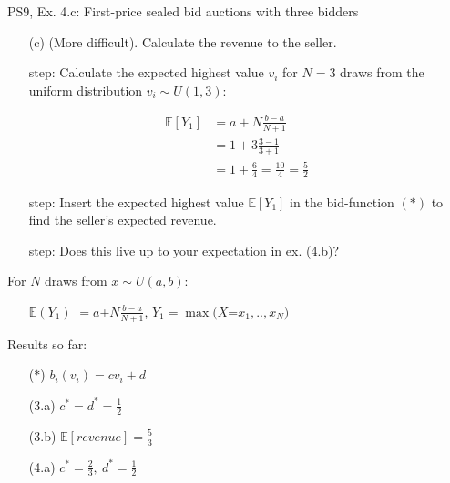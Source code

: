 \begin{frame}{PS9, Ex. 4.c: First-price sealed bid auctions with three bidders}
    \begin{itemize}
      \item[(c)] (More difficult). Calculate the revenue to the seller.
    \end{itemize}
    \vspace{-10pt}
    \begin{multicols}{2}
      \begin{itemize}
        \item[\nth{1} step:] Calculate the expected highest value $v_i$ for $N=3$ draws from the uniform distribution $v_i\sim U(1,3)$:
      \end{itemize}
      \vspace{-8pt}
      \begin{align*}
        \mathbb{E}[Y_1]&=a+N\frac{b-a}{N+1}\\
                       &=1+3\frac{3-1}{3+1}\\
                       &=1+\frac{6}{4}=\frac{10}{4}=\frac{5}{2}
      \end{align*}
      \vspace{-12pt}
      \begin{itemize}
        \item[\nth{2} step:] Insert the expected highest value $\mathbb{E}[Y_1]$ in the bid-function $(*)$  to find the seller's expected revenue.
        \item[\nth{3} step:] Does this live up to your expectation in ex. (4.b)?
      \end{itemize}
      \vfill\null\columnbreak
      For $N$ draws from $x\sim U(a, b):$
      \vspace{-6pt}
      \begin{enumerate}
        \item[$\mathbb{E}(Y_1)$] $=a$+$N\frac{b-a}{N+1}$, $Y_1=\max(X$=$x_1,..,x_N)$
      \end{enumerate}
      \vspace{-6pt}
      Results so far:
      \vspace{-6pt}
      \begin{itemize}
        \item[($*$)] $b_i(v_i) = cv_i+d$
        \item[(3.a)] $c^*=d^*=\frac{1}{2}$
        \item[(3.b)] $\mathbb{E}[revenue]=\frac{5}{3}$
        \item[(4.a)] $c^*=\frac{2}{3},\ d^*=\frac{1}{2}$

\end{itemize}
\end{multicols}
\end{frame}
